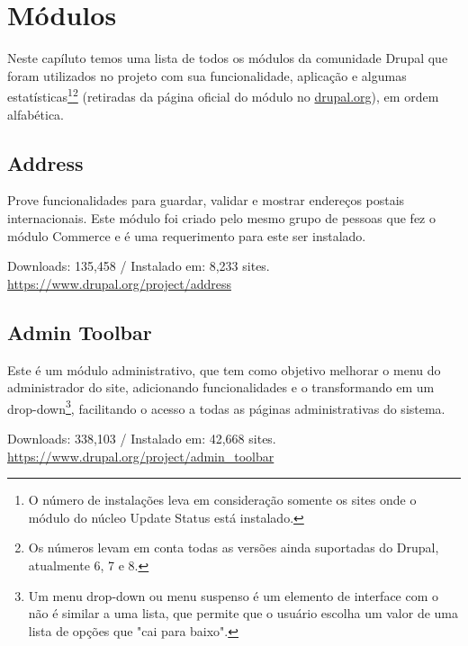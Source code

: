 \chapter{Módulos}

Neste capíluto temos uma lista de todos os módulos da comunidade Drupal que foram utilizados no projeto com sua funcionalidade, aplicação e algumas estatísticas\footnote{O número de instalações leva em consideração somente os sites onde o módulo do núcleo Update Status está instalado.}\footnote{Os números levam em conta todas as versões ainda suportadas do Drupal, atualmente 6, 7 e 8.} (retiradas da página oficial do módulo no \url{drupal.org}), em ordem alfabética.

\section{Address}
Prove funcionalidades para guardar, validar e mostrar endereços postais internacionais.
Este módulo foi criado pelo mesmo grupo de pessoas que fez o módulo Commerce e é uma requerimento para este ser instalado.

\begin{center}
  Downloads: 135,458 / Instalado em: 8,233 sites. \\
  \url{https://www.drupal.org/project/address}
\end{center}

\section{Admin Toolbar}
Este é um módulo administrativo, que tem como objetivo melhorar o menu do administrador do site, adicionando funcionalidades e o transformando em um drop-down\footnote{Um menu drop-down ou menu suspenso é um elemento de interface com o não é similar a uma lista, que permite que o usuário escolha um valor de uma lista de opções que "cai para baixo".}, facilitando o acesso a todas as páginas administrativas do sistema.

\begin{center}
  Downloads: 338,103 / Instalado em: 42,668 sites. \\
  \url{https://www.drupal.org/project/admin_toolbar}
\end{center}

